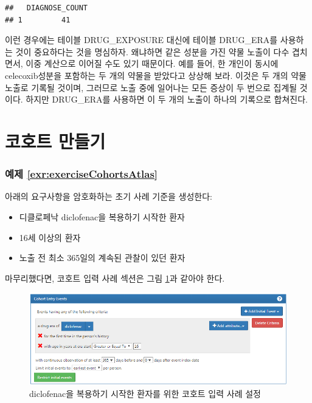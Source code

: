 \documentclass[10.5pt]{book}
\providecommand{\tightlist}{%
  \setlength{\itemsep}{0pt}\setlength{\parskip}{0pt}}
\theoremstyle{definition}
\theoremstyle{definition}
\theoremstyle{definition}
\theoremstyle{remark}
\begin{document}
\begin{verbatim}
##   DIAGNOSE_COUNT
## 1         41
\end{verbatim}

이런 경우에는 테이블 DRUG\_EXPOSURE 대신에 테이블 DRUG\_ERA를 사용하는
것이 중요하다는 것을 명심하자. 왜냐하면 같은 성분을 가진 약물 노출이
다수 겹치면서, 이중 계산으로 이어질 수도 있기 때문이다. 예를 들어, 한
개인이 동시에 celecoxib성분을 포함하는 두 개의 약물을 받았다고 상상해
보라. 이것은 두 개의 약물 노출로 기록될 것이며, 그러므로 노출 중에
일어나는 모든 증상이 두 번으로 집계될 것이다. 하지만 DRUG\_ERA를
사용하면 이 두 개의 노출이 하나의 기록으로 합쳐진다.

\section{코호트 만들기}\label{Cohortsanswers}

\subsubsection*{예제
\ref{exr:exerciseCohortsAtlas}}\label{-refexrexercisecohortsatlas}

아래의 요구사항을 암호화하는 초기 사례 기준을 생성한다:

\begin{itemize}
\tightlist
\item
  디클로페낙 diclofenac을 복용하기 시작한 환자
\item
  16세 이상의 환자
\item
  노출 전 최소 365일의 계속된 관찰이 있던 환자
\end{itemize}

마무리했다면, 코호트 입력 사례 섹션은 그림
\ref{fig:cohortsAtlasInitialEvents}과 같아야 한다.

\begin{figure}

{\centering \includegraphics[width=1\linewidth]{images/SuggestedAnswers/cohortsAtlasInitialEvents} 

}

\caption{diclofenac을 복용하기 시작한 환자를 위한 코호트 입력 사례 설정}\label{fig:cohortsAtlasInitialEvents}
\end{figure}
\end{document}
